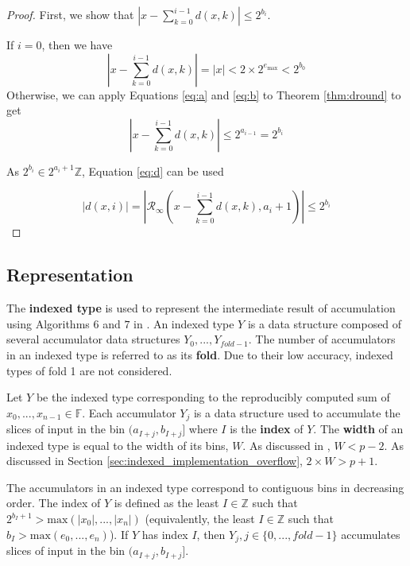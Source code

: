\documentclass[12pt]{article}
\providecommand{\F}{\ensuremath{\mathbb{F}}}
\providecommand{\Z}{\ensuremath{\mathbb{Z}}}
\providecommand{\max}{\ensuremath{\text{max}}}
\providecommand{\roundtonearestinfty}{\ensuremath{\mathcal{R}_\text{$\infty$}}}
\theoremstyle{definition}
\numberwithin{equation}{section}
\begin{document}
    \begin{proof}
      First, we show that $|x - \sum\limits_{k=0}^{i - 1}d(x,k)| \leq 2^{b_i}$.

      If $i = 0$, then we have
      \begin{equation*}
        |x - \sum\limits_{k=0}^{i - 1}d(x,k)| = |x| < 2 \times 2^{e_{\max}} < 2^{b_0}
      \end{equation*}
      Otherwise, we can apply Equations \ref{eq:a} and \ref{eq:b} to Theorem \ref{thm:dround} to get
      \begin{equation*}
        |x - \sum \limits_{k = 0}^{i - 1}d(x, k)| \leq 2^{a_{i - 1}} = 2^{b_i}
      \end{equation*}

      As $2^{b_i} \in 2^{a_i + 1}\Z$, Equation \ref{eq:d} can be used

      \begin{equation*}
        |d(x, i)| = |\roundtonearestinfty(x - \sum\limits_{k=0}^{i - 1}d(x,k), a_i + 1)| \leq 2^{b_i}
      \end{equation*}
    \end{proof}

  \subsection{Representation}
    \label{sec:indexed_representation}
    The \textbf{indexed type} is used to represent the intermediate result of accumulation using Algorithms 6 and $7$ in \cite{repsum}.
    An indexed type $Y$ is a data structure composed of several accumulator data structures $Y_0, ..., Y_{fold - 1}$. The number of accumulators in an indexed type is referred to as its \textbf{fold}. Due to their low accuracy, indexed types of fold 1 are not considered.

    Let $Y$ be the indexed type corresponding to the reproducibly computed sum of $x_0, ..., x_{n - 1} \in \F$.
    Each accumulator $Y_j$ is a data structure used to accumulate the slices of input in the bin $(a_{I + j}, b_{I + j}]$ where $I$ is the \textbf{index} of $Y$. The \textbf{width} of an indexed type is equal to the width of its bins, $W$. As discussed in \cite{repsum}, $W < p - 2$. As discussed in Section \ref{sec:indexed_implementation_overflow}, $2\times W > p + 1$.

    The accumulators in an indexed type correspond to contiguous bins in decreasing order. The index of $Y$ is defined as the least $I \in \Z$ such that $2^{b_I + 1} > \max(|x_0|, ..., |x_n|)$ (equivalently, the least $I \in \Z$ such that $b_I > \max(e_0, ..., e_n)$). If $Y$ has index $I$, then $Y_j, j \in \{0, ..., fold - 1\}$ accumulates slices of input in the bin $(a_{I + j}, b_{I + j}]$.
\end{document}
